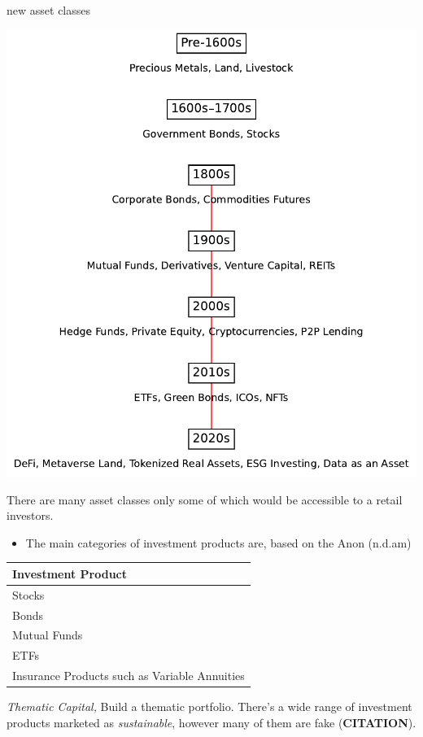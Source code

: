 \documentclass[
  letterpaper,
  DIV=11,
  numbers=noendperiod]{scrartcl}
\providecommand{\tightlist}{%
  \setlength{\itemsep}{0pt}\setlength{\parskip}{0pt}}\usepackage{longtable,booktabs,array}
\begin{document}
new asset classes

\includegraphics{_thesis_files/figure-pdf/cell-43-output-1.pdf}

There are many asset classes only some of which would be accessible to a
retail investors.

\begin{itemize}
\tightlist
\item
  The main categories of investment products are, based on the Anon
  (n.d.am)
\end{itemize}

\begin{longtable}[]{@{}l@{}}
\toprule\noalign{}
Investment Product \\
\midrule\noalign{}
\endhead
\bottomrule\noalign{}
\endlastfoot
Stocks \\
Bonds \\
Mutual Funds \\
ETFs \\
Insurance Products such as Variable Annuities \\
\end{longtable}

\emph{Thematic Capital,} Build a thematic portfolio. There's a wide
range of investment products marketed as \emph{sustainable}, however
many of them are fake (\textbf{CITATION}).
\end{document}
